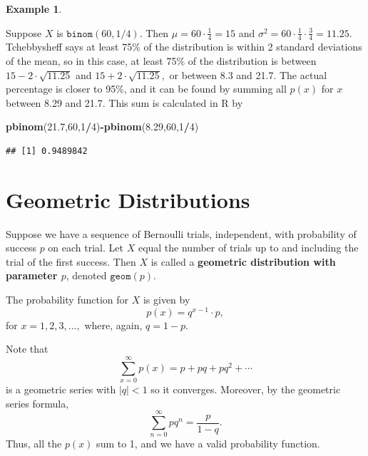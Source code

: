 \documentclass[
]{book}
\newenvironment{Shaded}{\begin{snugshade}}{\end{snugshade}}
\newcommand{\DecValTok}[1]{\textcolor[rgb]{0.00,0.00,0.81}{#1}}
\newcommand{\FloatTok}[1]{\textcolor[rgb]{0.00,0.00,0.81}{#1}}
\newcommand{\FunctionTok}[1]{\textcolor[rgb]{0.13,0.29,0.53}{\textbf{#1}}}
\newcommand{\NormalTok}[1]{#1}
\newcommand{\SpecialCharTok}[1]{\textcolor[rgb]{0.81,0.36,0.00}{\textbf{#1}}}
\theoremstyle{definition}
\theoremstyle{definition}
\newtheorem{example}{Example}[chapter]
\theoremstyle{definition}
\theoremstyle{definition}
\theoremstyle{remark}
\begin{document}
\begin{example}
\protect\hypertarget{exm:binomial-tchebby}{}\label{exm:binomial-tchebby}

Suppose \(X\) is \(\texttt{binom}(60,1/4)\). Then \(\mu = 60\cdot\frac{1}{4} = 15\) and \(\sigma^2 = 60\cdot \frac{1}{4} \cdot \frac{3}{4} = 11.25.\)
Tchebbysheff says at least 75\% of the distribution is within 2 standard deviations of the mean, so in this case, at least 75\% of the distribution is between \(15 - 2\cdot \sqrt{11.25}\) and \(15 + 2\cdot \sqrt{11.25},\) or between 8.3 and 21.7. The actual percentage is closer to 95\%, and it can be found by summing all \(p(x)\) for \(x\) between 8.29 and 21.7. This sum is calculated in R by

\begin{Shaded}
\begin{Highlighting}[]
\FunctionTok{pbinom}\NormalTok{(}\FloatTok{21.7}\NormalTok{,}\DecValTok{60}\NormalTok{,}\DecValTok{1}\SpecialCharTok{/}\DecValTok{4}\NormalTok{)}\SpecialCharTok{{-}}\FunctionTok{pbinom}\NormalTok{(}\FloatTok{8.29}\NormalTok{,}\DecValTok{60}\NormalTok{,}\DecValTok{1}\SpecialCharTok{/}\DecValTok{4}\NormalTok{)}
\end{Highlighting}
\end{Shaded}

\begin{verbatim}
## [1] 0.9489842
\end{verbatim}

\end{example}

\section{Geometric Distributions}\label{geometric}

Suppose we have a sequence of Bernoulli trials, independent, with probability of success \(p\) on each trial. Let \(X\) equal the number of trials up to and including the trial of the first success. Then \(X\) is called a \textbf{geometric distribution with parameter \(p\)}, denoted \(\texttt{geom}(p)\).

The probability function for \(X\) is given by \[p(x) = q^{x-1}\cdot p,\] for \(x = 1, 2, 3, \ldots,\) where, again, \(q = 1-p\).

Note that \[\sum_{x=0}^\infty p(x) = p + pq + pq^2 + \cdots\] is a geometric series with \(|q| < 1\) so it converges. Moreover, by the geometric series formula, \[\sum_{n=0}^\infty pq^n = \frac{p}{1-q}.\]
Thus, all the \(p(x)\) sum to 1, and we have a valid probability function.
\end{document}
